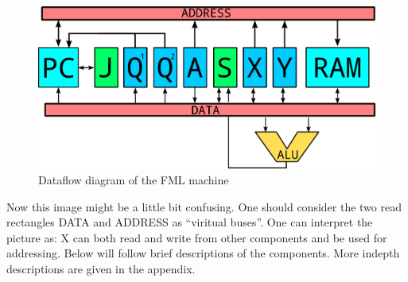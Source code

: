 \documentclass{article}
\begin{document}
\begin{figure}[H]
\includegraphics[width=\textwidth,height=\textheight,keepaspectratio]{Dataflow.png}
\caption{Dataflow diagram of the FML machine}
\end{figure}       

Now this image might be a little bit confusing. One should consider the two read
rectangles DATA and ADDRESS as ``viritual buses''. One can interpret the picture
as: X can both read and write from other components and be used for addressing.
Below will follow brief descriptions of the components. More indepth
descriptions are given in the appendix.
\end{document}
